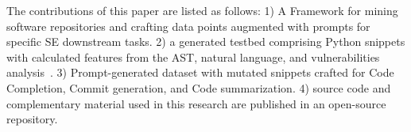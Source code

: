 The contributions of this paper are listed as follows: 1) A Framework for mining software repositories and crafting data points augmented with prompts for specific SE downstream tasks. 2) a generated testbed comprising Python snippets with calculated features from the AST, natural language, and vulnerabilities analysis~\cite{zenodo_14279563}. 3) Prompt-generated dataset with mutated snippets crafted for Code Completion, Commit generation, and Code summarization. 4) source code and complementary material used in this research are published in an open-source repository\cite{snipgen}.